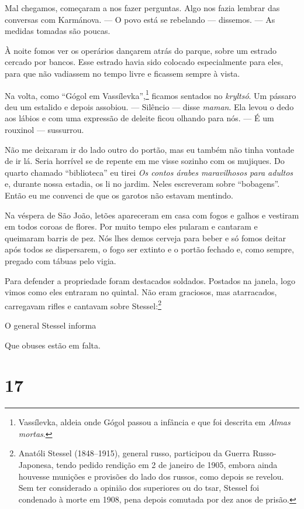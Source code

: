 Mal chegamos, começaram a nos fazer perguntas. Algo nos fazia lembrar
das conversas com Karmánova. --- O povo está se rebelando --- dissemos.
--- As medidas tomadas são poucas.

À noite fomos ver os operários dançarem atrás do parque, sobre um
estrado cercado por bancos. Esse estrado havia sido colocado
especialmente para eles, para que não vadiassem no tempo livre e
ficassem sempre à vista.

Na volta, como ``Gógol em Vassílevka'',\footnote{Vassílevka, aldeia onde
  Gógol passou a infância e que foi descrita em \emph{Almas mortas}.}
ficamos sentados no \emph{kryltsó}. Um pássaro deu um estalido e depois
assobiou. --- Silêncio --- disse \emph{maman}. Ela levou o dedo aos
lábios e com uma expressão de deleite ficou olhando para nós. --- É um
rouxinol --- sussurrou.

Não me deixaram ir do lado outro do portão, mas eu também não tinha
vontade de ir lá. Seria horrível se de repente em me visse sozinho com
os mujiques. Do quarto chamado ``biblioteca'' eu tirei \emph{Os contos
árabes maravilhosos para adultos} e, durante nossa estadia, os li no
jardim. Neles escreveram sobre ``bobagens''. Então eu me convenci de que
os garotos não estavam mentindo.

Na véspera de São João, letões apareceram em casa com fogos e galhos e
vestiram em todos coroas de flores. Por muito tempo eles pularam e
cantaram e queimaram barris de pez. Nós lhes demos cerveja para beber e
só fomos deitar após todos se dispersarem, o fogo ser extinto e o portão
fechado e, como sempre, pregado com tábuas pelo vigia.

Para defender a propriedade foram destacados soldados. Postados na
janela, logo vimos como eles entraram no quintal. Não eram graciosos,
mas atarracados, carregavam rifles e cantavam sobre Stessel:\footnote{Anatóli
  Stessel (1848--1915), general russo, participou da Guerra
  Russo-Japonesa, tendo pedido rendição em 2 de janeiro de 1905, embora
  ainda houvesse munições e provisões do lado dos russos, como depois se
  revelou. Sem ter considerado a opinião dos superiores ou do tsar,
  Stessel foi condenado à morte em 1908, pena depois comutada por dez
  anos de prisão.}

O general Stessel informa

Que obuses estão em falta.

\section{17}

